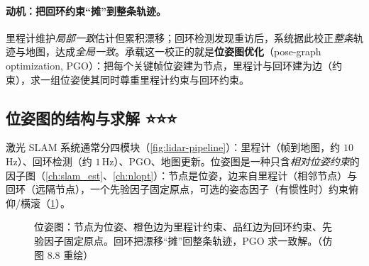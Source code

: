 \paragraph{动机：把回环约束“摊”到整条轨迹。}
里程计维护\emph{局部一致}估计但累积漂移；回环检测发现重访后，系统据此校正\emph{整条}轨迹与地图，达成\emph{全局一致}\cite{carlone2026handbook}。承载这一校正的就是\textbf{位姿图优化}（pose-graph optimization, PGO）：把每个关键帧位姿建为节点，里程计与回环建为边（约束），求一组位姿使其同时尊重里程计约束与回环约束。

\subsection{位姿图的结构与求解 ⭐⭐⭐}
\label{sec:lidar-pgo}

激光 SLAM 系统通常分四模块（\cref{fig:lidar-pipeline}）\cite{carlone2026handbook}：里程计（帧到地图，约 $10$\,Hz）、回环检测（约 $1$\,Hz）、PGO、地图更新。位姿图是一种只含\emph{相对位姿约束}的因子图（\cref{ch:slam_est}、\cref{ch:nlopt}）：节点是位姿，边来自里程计（相邻节点）与回环（远隔节点），一个先验因子固定原点，可选的姿态因子（有惯性时）约束俯仰/横滚（\cref{fig:lidar-posegraph}）。

\begin{figure}[ht]
\centering
{}
\caption{位姿图：节点为位姿、橙色边为里程计约束、品红边为回环约束、先验因子固定原点。回环把漂移“摊”回整条轨迹，PGO 求一致解。（仿 \cite{carlone2026handbook} 图 8.8 重绘）}
\label{fig:lidar-posegraph}
\end{figure}

